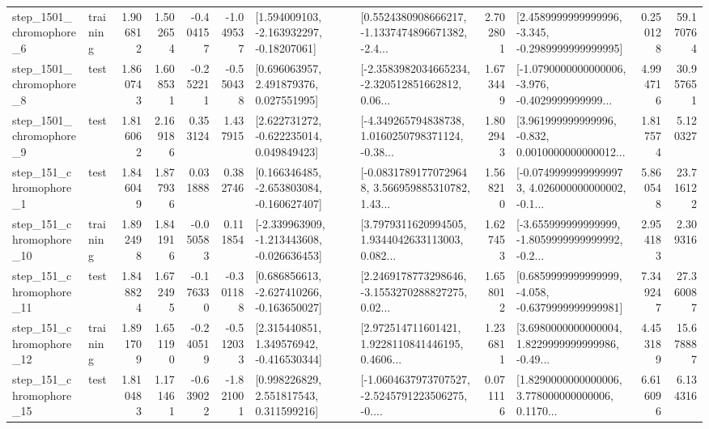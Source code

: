 \begin{tabular}{llrrrrllrlrr}
  step\_1501\_chromophore\_6 &  training &      1.906812 &    1.502654 &     -0.404157 & -1.049537 &    [1.594009103, -2.163932297, -0.18207061] &  [0.5524380908666217, -1.1337474896671382, -2.4... &       2.702801 &  [2.4589999999999996, -3.345, -0.2989999999999995] &            0.250128 &         59.170764 \\
  step\_1501\_chromophore\_8 &      test &      1.860743 &    1.608531 &     -0.252211 & -0.550438 &     [0.696063957, 2.491879376, 0.027551995] &  [-2.3583982034665234, -2.320512851662812, 0.06... &       1.673449 &  [-1.0790000000000006, -3.976, -0.4029999999999... &            4.994716 &         30.957651 \\
  step\_1501\_chromophore\_9 &      test &      1.816062 &    2.169186 &      0.353124 &  1.437915 &    [2.622731272, -0.622235014, 0.049849423] &  [-4.349265794838738, 1.0160250798371124, -0.38... &       1.802943 &  [3.961999999999996, -0.832, 0.0010000000000012... &            1.817574 &          5.120327 \\
   step\_151\_chromophore\_1 &      test &      1.846049 &    1.877936 &      0.031888 &  0.382746 &   [0.166346485, -2.653803084, -0.160627407] &  [-0.08317891770729648, 3.566959885310782, 1.43... &       1.568210 &  [-0.07499999999999973, 4.026000000000002, -0.1... &            5.860548 &         23.716122 \\
  step\_151\_chromophore\_10 &  training &      1.892498 &    1.841916 &     -0.050583 &  0.111854 &  [-2.339963909, -1.213443608, -0.026636453] &  [3.7979311620994505, 1.9344042633113003, 0.082... &       1.627453 &  [-3.655999999999999, -1.8059999999999992, -0.2... &            2.954183 &          2.309316 \\
  step\_151\_chromophore\_11 &      test &      1.848824 &    1.672495 &     -0.176330 & -0.301188 &   [0.686856613, -2.627410266, -0.163650027] &  [2.2469178773298646, -3.1553270288827275, 0.02... &       1.658012 &  [0.6859999999999999, -4.058, -0.6379999999999981] &            7.349247 &         27.360087 \\
  step\_151\_chromophore\_12 &  training &      1.891709 &    1.651190 &     -0.240519 & -0.512033 &    [2.315440851, 1.349576942, -0.416530344] &  [2.972514711601421, 1.9228110841446195, 0.4606... &       1.236811 &  [3.6980000000000004, 1.8229999999999986, -0.49... &            4.453189 &         15.678887 \\
  step\_151\_chromophore\_15 &      test &      1.810483 &    1.171461 &     -0.639022 & -1.821001 &     [0.998226829, 2.551817543, 0.311599216] &  [-1.0604637973707527, -2.5245791223506275, -0.... &       0.071116 &  [1.8290000000000006, 3.778000000000006, 0.1170... &            6.616096 &          6.134316 \\

\end{tabular}
